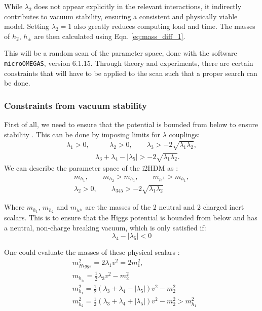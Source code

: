 \documentclass[12pt]{article}
\begin{document}
While $\lambda_2$ does not appear explicitly in the relevant interactions, it indirectly contributes to vacuum stability, ensuring a consistent and physically viable model. Setting $\lambda_2 = 1$ also greatly reduces computing load and time. The masses of $h_2$, $h_\pm$ are then calculated using Eqn. \ref{eq:mass_diff_1}.

This will be a random scan of the parameter space, done with the software \verb|microOMEGAS|, version 6.1.15. Through theory and experiments, there are certain constraints that will have to be applied to the scan such that a proper search can be done.

\subsubsection{Constraints from vacuum stability}
First of all, we need to ensure that the potential is bounded from below to ensure stability \cite{Deshpande:1977rw}. This can be done by imposing limits for $\lambda$ couplings:
\begin{equation}
    \begin{split}
    \lambda_1>0,& \qquad
    \lambda_2>0, \qquad
    \lambda_3> -2 \sqrt{ \lambda_1 \lambda_2}, \\
    &\lambda_3 + \lambda_4 - |\lambda_5| > -2 \sqrt{ \lambda_1 \lambda_2}.
    \end{split}
    \label{eq:potential_stability}
\end{equation}
We can describe the parameter space of the i2HDM as \cite{Belyaev:2016lok}:
\begin{equation}
    \begin{split}
        m_{h_1}, \qquad m_{h_2} > m_{h_1}, \qquad m_{h^\pm} > m_{h_1}, \\
        \lambda_2 > 0, \qquad \lambda_{345} > -2\sqrt{\lambda_1 \lambda_2}
    \end{split}
\end{equation}

Where $m_{h_1}$, $m_{h_2}$ and $m_{h^\pm}$ are the masses of the 2 neutral and 2 charged inert scalars. This is to ensure that the Higgs potential is bounded from below and has a neutral, non-charge breaking vacuum, which is only satisfied if:
\begin{equation}
    \lambda_4 - |\lambda_5| < 0
\end{equation}

One could evaluate the masses of these physical scalars \cite{Belyaev:2016lok}:
\begin{align}
    \label{eqn:scalar_equations}
    &m_{Higgs}^2 = 2\lambda_1v^2 = 2m^2_1,\\
    &m_{h_\pm} = \frac{1}{2}\lambda_3v^2-m^2_2 \\
    \label{eqn:massdmscalar}
    &m_{h_1}^2 = \frac{1}{2}(\lambda_3 + \lambda_4 - |\lambda_5|)v^2 - m_2^2\\
    &m_{h_2}^2 = \frac{1}{2}(\lambda_3 + \lambda_4 + |\lambda_5|)v^2 - m_2^2 > m^2_{h_1}
\end{align}
\end{document}
